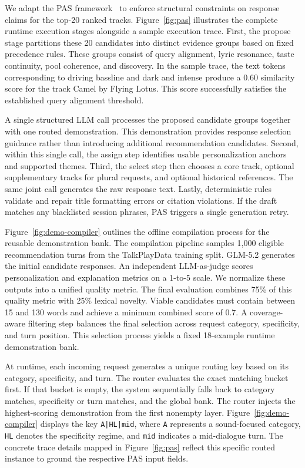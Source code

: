 We adapt the PAS framework~\cite{wang2023goalex} to enforce structural constraints on response claims for the top-20 ranked tracks. Figure~\ref{fig:pas} illustrates the complete runtime execution stages alongside a sample execution trace. First, the propose stage partitions these 20 candidates into distinct evidence groups based on fixed precedence rules. These groups consist of query alignment, lyric resonance, taste continuity, pool coherence, and discovery. In the sample trace, the text tokens corresponding to driving bassline and dark and intense produce a 0.60 similarity score for the track Camel by Flying Lotus. This score successfully satisfies the established query alignment threshold.

A single structured LLM call processes the proposed candidate groups together with one routed demonstration. This demonstration provides response selection guidance rather than introducing additional recommendation candidates. Second, within this single call, the assign step identifies usable personalization anchors and supported themes. Third, the select step then chooses a core track, optional supplementary tracks for plural requests, and optional historical references. The same joint call generates the raw response text. Lastly, deterministic rules validate and repair title formatting errors or citation violations. If the draft matches any blacklisted session phrases, PAS triggers a single generation retry.

Figure~\ref{fig:demo-compiler} outlines the offline compilation process for the reusable demonstration bank. The compilation pipeline samples 1,000 eligible recommendation turns from the TalkPlayData training split. GLM-5.2 generates the initial candidate responses. An independent LLM-as-judge scores personalization and explanation metrics on a 1-to-5 scale. We normalize these outputs into a unified quality metric. The final evaluation combines 75\% of this quality metric with 25\% lexical novelty. Viable candidates must contain between 15 and 130 words and achieve a minimum combined score of 0.7. A coverage-aware filtering step balances the final selection across request category, specificity, and turn position. This selection process yields a fixed 18-example runtime demonstration bank.

At runtime, each incoming request generates a unique routing key based on its category, specificity, and turn. The router evaluates the exact matching bucket first. If that bucket is empty, the system sequentially falls back to category matches, specificity or turn matches, and the global bank. The router injects the highest-scoring demonstration from the first nonempty layer. Figure~\ref{fig:demo-compiler} displays the key \texttt{A|HL|mid}, where \texttt{A} represents a sound-focused category, \texttt{HL} denotes the specificity regime, and \texttt{mid} indicates a mid-dialogue turn. The concrete trace details mapped in Figure~\ref{fig:pas} reflect this specific routed instance to ground the respective PAS input fields.